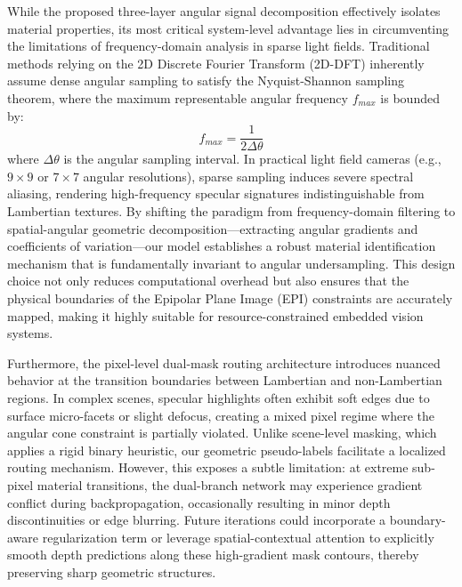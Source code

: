 While the proposed three-layer angular signal decomposition effectively isolates material properties, its most critical system-level advantage lies in circumventing the limitations of frequency-domain analysis in sparse light fields. Traditional methods relying on the 2D Discrete Fourier Transform (2D-DFT) inherently assume dense angular sampling to satisfy the Nyquist-Shannon sampling theorem, where the maximum representable angular frequency $f_{max}$ is bounded by:
\begin{equation}
\label{eq:eq31}
f_{max} = \frac{1}{2 \Delta \theta}
\end{equation}
where $\Delta \theta$ is the angular sampling interval. In practical light field cameras (e.g., $9 \times 9$ or $7 \times 7$ angular resolutions), sparse sampling induces severe spectral aliasing, rendering high-frequency specular signatures indistinguishable from Lambertian textures. By shifting the paradigm from frequency-domain filtering to spatial-angular geometric decomposition—extracting angular gradients and coefficients of variation—our model establishes a robust material identification mechanism that is fundamentally invariant to angular undersampling. This design choice not only reduces computational overhead but also ensures that the physical boundaries of the Epipolar Plane Image (EPI) constraints are accurately mapped, making it highly suitable for resource-constrained embedded vision systems.

Furthermore, the pixel-level dual-mask routing architecture introduces nuanced behavior at the transition boundaries between Lambertian and non-Lambertian regions. In complex scenes, specular highlights often exhibit soft edges due to surface micro-facets or slight defocus, creating a mixed pixel regime where the angular cone constraint is partially violated. Unlike scene-level masking, which applies a rigid binary heuristic, our geometric pseudo-labels facilitate a localized routing mechanism. However, this exposes a subtle limitation: at extreme sub-pixel material transitions, the dual-branch network may experience gradient conflict during backpropagation, occasionally resulting in minor depth discontinuities or edge blurring. Future iterations could incorporate a boundary-aware regularization term or leverage spatial-contextual attention to explicitly smooth depth predictions along these high-gradient mask contours, thereby preserving sharp geometric structures.


